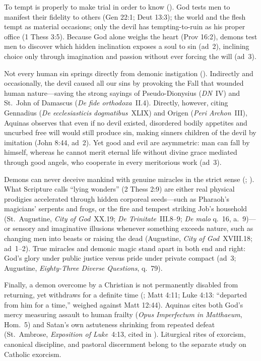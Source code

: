 To tempt is properly to make trial in order to know (). God tests men to manifest their fidelity to others (Gen 22:1; Deut 13:3); the world and the flesh tempt as material occasions; only the devil has tempting-to-ruin as his proper office (1 Thess 3:5). Because God alone weighs the heart (Prov 16:2), demons test men to discover which hidden inclination exposes a soul to sin (ad~2), inclining choice only through imagination and passion without ever forcing the will (ad~3).

Not every human sin springs directly from demonic instigation (). Indirectly and occasionally, the devil caused all our sins by provoking the Fall that wounded human nature---saving the strong sayings of Pseudo-Dionysius (\emph{DN}~IV) and St.~John of Damascus (\emph{De fide orthodoxa}~II.4). Directly, however, citing Gennadius (\emph{De ecclesiasticis dogmatibus}~XLIX) and Origen (\emph{Peri Archon}~III), Aquinas observes that even if no devil existed, disordered bodily appetites and uncurbed free will would still produce sin, making sinners children of the devil by imitation (John 8:44, ad~2). Yet good and evil are asymmetric: man can fall by himself, whereas he cannot merit eternal life without divine grace mediated through good angels, who cooperate in every meritorious work (ad~3).

Demons can never deceive mankind with genuine miracles in the strict sense (; ). What Scripture calls ``lying wonders'' (2 Thess 2:9) are either real physical prodigies accelerated through hidden corporeal seeds---such as Pharaoh's magicians' serpents and frogs, or the fire and tempest striking Job's household (St.~Augustine, \emph{City of God}~XX.19; \emph{De Trinitate}~III.8--9; \emph{De malo} q.~16, a.~9)---or sensory and imaginative illusions whenever something exceeds nature, such as changing men into beasts or raising the dead (Augustine, \emph{City of God}~XVIII.18; ad~1--2). True miracles and demonic magic stand apart in both end and right: God's glory under public justice versus pride under private compact (ad~3; Augustine, \emph{Eighty-Three Diverse Questions}, q.~79).

Finally, a demon overcome by a Christian is not permanently disabled from returning, yet withdraws for a definite time (; Matt 4:11; Luke 4:13: ``departed from him for a time,'' weighed against Matt 12:44). Aquinas cites both God's mercy measuring assault to human frailty (\emph{Opus Imperfectum in Matthaeum}, Hom.~5) and Satan's own astuteness shrinking from repeated defeat (St.~Ambrose, \emph{Exposition of Luke}~4:13, cited in ). Liturgical rites of exorcism, canonical discipline, and pastoral discernment belong to the separate study on Catholic exorcism.

